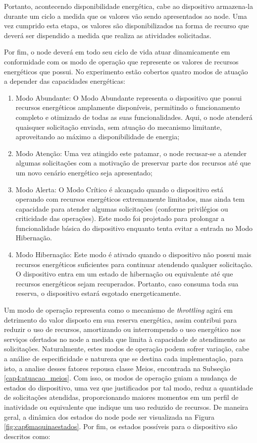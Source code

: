 Portanto, acontecendo disponibilidade energética, cabe ao dispositivo armazena-la durante um ciclo a medida que os valores vão sendo apresentados ao node. Uma vez cumprido esta etapa, os valores são disponibilizados na forma de recurso que deverá ser dispendido a medida que realiza as atividades solicitadas.

Por fim, o node deverá em todo seu ciclo de vida atuar dinamicamente em conformidade com os modo de operação que represente os valores de recursos energéticos que possui. No experimento estão cobertos quatro modos de atuação a depender das capacidades energéticas:

\begin{enumerate}	
\item Modo Abundante: O Modo Abundante representa o dispositivo que possui recursos energéticos amplamente disponíveis, permitindo o funcionamento completo e otimizado de todas as suas funcionalidades. Aqui, o node atenderá quaisquer solicitação enviada, sem atuação do mecanismo limitante, aproveitando ao máximo a disponibilidade de energia;
\item Modo Atenção: Uma vez atingido este patamar, o node recusar-se a atender algumas solicitações com a motivação de preservar parte dos recursos até que um novo cenário energético seja apresentado;
\item Modo Alerta: O Modo Crítico é alcançado quando o dispositivo está operando com recursos energéticos extremamente limitados, mas ainda tem capacidade para atender algumas solicitações (conforme privilégios ou criticidade das operações). Este modo foi projetado para prolongar a funcionalidade básica do dispositivo enquanto tenta evitar a entrada no Modo Hibernação. 
\item Modo Hibernação: Este modo é ativado quando o dispositivo não possui mais recursos energéticos suficientes para continuar atendendo qualquer solicitação. O dispositivo entra em um estado de hibernação ou equivalente até que recursos energéticos sejam recuperados. Portanto, caso consuma toda sua reserva, o dispositivo estará esgotado energeticamente.
\end{enumerate}

Um modo de operação representa como o mecanismo de \textit{throttling} agirá em detrimento do valor disposto em sua reserva energética, assim contribui para reduzir o uso de recursos, amortizando ou interrompendo o uso energético nos serviços ofertados no node a medida que limita à capacidade de atendimento as solicitações. Naturalmente, estes modos de operação podem sofrer variação, cabe a análise de especificidade e natureza que se destina cada implementação, para isto, a analise desses fatores repousa classe Meios, encontrada na Subseção \ref{cap4:atuacao_meios}. Com isso, os modos de operação guiam a mudança de estados do dispositivo, uma vez que justificados por tal modo, reduz a quantidade de solicitações atendidas, proporcionando maiores momentos em um perfil de inatividade ou equivalente que indique um uso reduzido de recursos. De maneira geral, a dinâmica dos estados do node pode ser visualizada na Figura \ref{fig:cap6maquinaestados}. Por fim, os estados possíveis para o dispositivo são descritos como:


